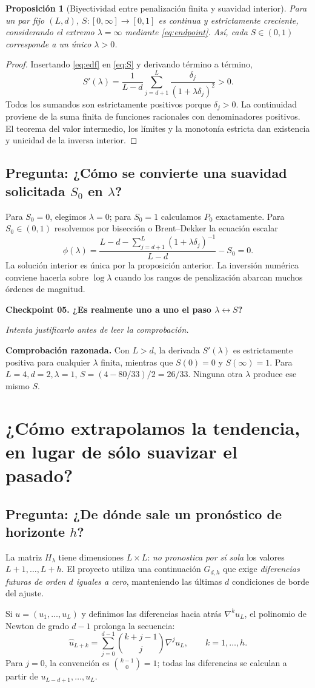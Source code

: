 \documentclass[11pt,letterpaper,parskip=half,headings=small]{scrartcl}
\newtheorem{proposicion}{Proposición}[section]
\theoremstyle{definition}\newtheorem{definicion}[proposicion]{Definición}
\theoremstyle{remark}\newtheorem{observacion}[proposicion]{Observación}
\newcommand{\pregunta}[1]{\subsection{Pregunta: #1}}
\newcommand{\checkpoint}[3]{%
  \par\medskip\noindent\textbf{\color{blue!45!black}Checkpoint #1. #2}\par
  \noindent\emph{Intenta justificarlo antes de leer la comprobación.}\par
  \noindent\textbf{Comprobación razonada. }#3\par\bigskip
}
\begin{document}
\begin{proposicion}[Biyectividad entre penalización finita y suavidad interior]\label{prop:Smono}
Para un par fijo $(L,d)$, $S:[0,\infty]\longrightarrow[0,1]$ es continua y estrictamente creciente, considerando el extremo $\lambda=\infty$ mediante \eqref{eq:endpoint}. Así, cada $S\in(0,1)$ corresponde a un único $\lambda>0$.
\end{proposicion}
\begin{proof}
Insertando \eqref{eq:edf} en \eqref{eq:S} y derivando término a término,
\[
\boxed{S'(\lambda)=\frac{1}{L-d}
\sum_{j=d+1}^L\frac{\delta_j}{(1+\lambda\delta_j)^2}>0.}
\]
Todos los sumandos son estrictamente positivos porque $\delta_j>0$. La continuidad proviene de la suma finita de funciones racionales con denominadores positivos. El teorema del valor intermedio, los límites y la monotonía estricta dan existencia y unicidad de la inversa interior.
\end{proof}

\pregunta{¿Cómo se convierte una suavidad solicitada $S_0$ en $\lambda$?}
Para $S_0=0$, elegimos $\lambda=0$; para $S_0=1$ calculamos $P_0$ exactamente. Para $S_0\in(0,1)$ resolvemos por bisección o Brent--Dekker la ecuación escalar
\[
\phi(\lambda)=\frac{L-d-\displaystyle\sum_{j=d+1}^L(1+\lambda\delta_j)^{-1}}{L-d}-S_0=0.
\]
La solución interior es única por la proposición anterior. La inversión numérica conviene hacerla sobre $\log\lambda$ cuando los rangos de penalización abarcan muchos órdenes de magnitud.

\checkpoint{05}{¿Es realmente uno a uno el paso $\lambda\leftrightarrow S$?}{Con $L>d$, la derivada $S'(\lambda)$ es estrictamente positiva para cualquier $\lambda$ finita, mientras que $S(0)=0$ y $S(\infty)=1$. Para $L=4,d=2,\lambda=1$, $S=(4-80/33)/2=26/33$. Ninguna otra $\lambda$ produce ese mismo $S$.}

\section{¿Cómo extrapolamos la tendencia, en lugar de sólo suavizar el pasado?}
\pregunta{¿De dónde sale un pronóstico de horizonte $h$?}
La matriz $H_\lambda$ tiene dimensiones $L\times L$: \emph{no pronostica por sí sola} los valores $L+1,\ldots,L+h$. El proyecto utiliza una continuación $G_{d,h}$ que exige \emph{diferencias futuras de orden $d$ iguales a cero}, manteniendo las últimas $d$ condiciones de borde del ajuste.

Si $u=(u_1,\ldots,u_L)$ y definimos las diferencias hacia atrás $\nabla^ku_L$, el polinomio de Newton de grado $d-1$ prolonga la secuencia:
\begin{equation}\label{eq:newton}
\boxed{\widehat u_{L+k}=\sum_{j=0}^{d-1}\binom{k+j-1}{j}\nabla^j u_L,
\qquad k=1,\ldots,h.}
\end{equation}
Para $j=0$, la convención es $\binom{k-1}{0}=1$; todas las diferencias se calculan a partir de $u_{L-d+1},\ldots,u_L$.
\end{document}
